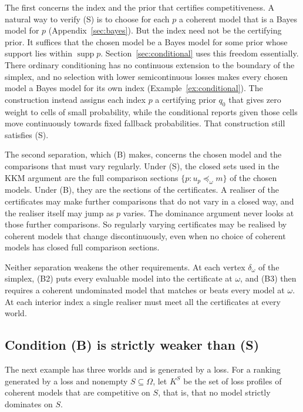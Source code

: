 \documentclass[11pt]{article}
\theoremstyle{definition}
\theoremstyle{remark}
\newcommand{\supp}{\operatorname{supp}}
\begin{document}
The first concerns the index and the prior that certifies competitiveness. A natural way to verify (S) is to choose for each $p$ a coherent model that is a Bayes model for $p$ (Appendix~\ref{sec:bayes}). But the index need not be the certifying prior. It suffices that the chosen model be a Bayes model for some prior whose support lies within $\supp p$. Section~\ref{sec:conditional} uses this freedom essentially. There ordinary conditioning has no continuous extension to the boundary of the simplex, and no selection with lower semicontinuous losses makes every chosen model a Bayes model for its own index (Example~\ref{ex:conditional}). The construction instead assigns each index $p$ a certifying prior $q_0$ that gives zero weight to cells of small probability, while the conditional reports given those cells move continuously towards fixed fallback probabilities. That construction still satisfies (S).

The second separation, which (B) makes, concerns the chosen model and the comparisons that must vary regularly. Under (S), the closed sets used in the KKM argument are the full comparison sections $\{p:u_p\preceq_\omega m\}$ of the chosen models. Under (B), they are the sections of the certificates. A realiser of the certificates may make further comparisons that do not vary in a closed way, and the realiser itself may jump as $p$ varies. The dominance argument never looks at those further comparisons. So regularly varying certificates may be realised by coherent models that change discontinuously, even when no choice of coherent models has closed full comparison sections.

Neither separation weakens the other requirements. At each vertex $\delta_\omega$ of the simplex, (B2) puts every evaluable model into the certificate at $\omega$, and (B3) then requires a coherent undominated model that matches or beats every model at $\omega$. At each interior index a single realiser must meet all the certificates at every world.

\subsection{Condition (B) is strictly weaker than (S)}\label{sec:strict-weakening}
The next example has three worlds and is generated by a loss. For a ranking generated by a loss and nonempty $S\subseteq\Omega$, let $K^S$ be the set of loss profiles of coherent models that are competitive on $S$, that is, that no model strictly dominates on $S$.
\end{document}
